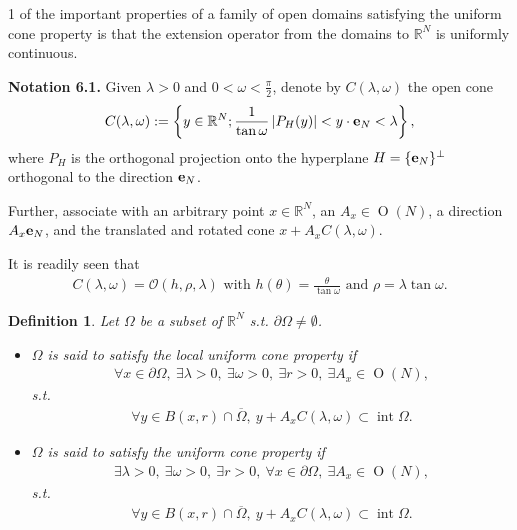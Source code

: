 \documentclass{book}
\numberwithin{equation}{section}
\newtheorem{definition}{Definition}[section]
\begin{document}
\begin{enumerate}
\begin{enumerate}
        1 of the important properties of a family of open domains satisfying the uniform cone property is that the extension operator from the domains to $\mathbb{R}^N$ is uniformly continuous.
        
        \textbf{Notation 6.1.} Given $\lambda > 0$ and $0 < \omega < \frac{\pi}{2}$, denote by $C(\lambda,\omega)$ the open cone
        \begin{align*}
            C(\lambda,\omega) := \left\{y\in\mathbb{R}^N;\frac{1}{\tan\omega}\left|P_H(y)\right| < y\cdot {\bf e}_N < \lambda\right\},
        \end{align*} 
        where $P_H$ is the orthogonal projection onto the hyperplane $H = \{{\bf e}_N\}^\bot$ orthogonal to the direction ${\bf e}_N$.
        
        Further, associate with an arbitrary point $x\in\mathbb{R}^N$, an $A_x\in\operatorname{O}(N)$, a direction $A_x{\bf e}_N$, and the translated and rotated cone $x + A_xC(\lambda,\omega)$.
        
        It is readily seen that
        \begin{align*}
            C(\lambda,\omega) = \mathcal{O}\left(h,\rho,\lambda\right) \mbox{ with } h(\theta) = \frac{\theta}{\tan\omega} \mbox{ and } \rho = \lambda\tan\omega.
        \end{align*}
        
        \begin{definition}
            Let $\Omega$ be a subset of $\mathbb{R}^N$ s.t. $\partial\Omega\ne\emptyset$.
            \begin{itemize}
                \item[(i)] $\Omega$ is said to satisfy the \emph{local uniform cone property} if
                \begin{align*}
                    \forall x\in\partial\Omega,\ \exists\lambda > 0,\ \exists\omega > 0,\ \exists r > 0,\ \exists A_x\in\operatorname{O}(N),
                \end{align*}
                s.t.
                \begin{align*}
                    \forall y\in B(x,r)\cap\overline{\Omega},\ y + A_xC\left(\lambda,\omega\right)\subset\operatorname{int}\Omega.
                \end{align*}
                \item[(ii)] $\Omega$ is said to satisfy the \emph{uniform cone property} if
                \begin{align*}
                    \exists\lambda > 0,\ \exists\omega > 0,\ \exists r >0,\ \forall x\in\partial\Omega,\ \exists A_x\in\operatorname{O}(N),
                \end{align*}
                s.t.
                \begin{align*}
                    \forall y\in B(x,r)\cap\overline{\Omega},\ y + A_xC\left(\lambda,\omega\right)\subset\operatorname{int}\Omega.
                \end{align*}
            \end{itemize}
        \end{definition}
    

\end{enumerate}
\end{enumerate}
\end{document}
